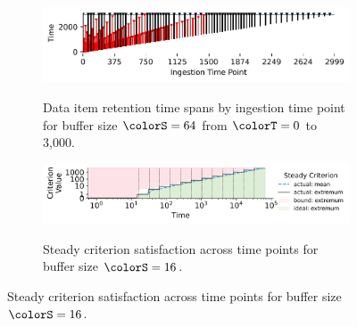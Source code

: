 \begin{figure}[htbp!]
  \vspace{-0.5ex}
   \begin{minipage}[]{\textwidth}
   \vspace{-2pt}
  \begin{subfigure}[t]{0.65\linewidth}
  \vspace{0pt}
    \centering
    \includegraphics[width=0.88\linewidth,clip]{binder/teeplots/11/num-generations=262144+surface-size=64+viz=stratum-persistence-dripplot+ext=}
  \end{subfigure}%
  \begin{subfigure}[t]{0.35\linewidth}
  \vspace{-2pt}
  \caption{%
    \footnotesize
    Data item retention time spans by ingestion time point for buffer size $\colorS=64$ from $\colorT=0$ to 3,000.
  }
  \label{fig:hsurf-steady-implementation-dripplot}
  \end{subfigure}
  \end{minipage}

  \vspace{-0.5ex}
 \begin{minipage}[]{\textwidth}
 \vspace{-2pt}
\begin{subfigure}[t]{0.65\linewidth}
\vspace{0pt}
  \centering
  \includegraphics[width=0.88\linewidth,clip]{binder/teeplots/11/hue=kind+surface-size=16+viz=criterion-satisfaction-lineplot+x=rank+y=steady-criterion+yscale=symlog+ext=}
\end{subfigure}%
\begin{subfigure}[t]{0.35\linewidth}
\vspace{-2pt}
\caption{%
  \footnotesize
  Steady criterion satisfaction across time points for buffer size $\colorS=16$.
}
\label{fig:hsurf-steady-implementation-satisfaction}
\end{subfigure}
\end{minipage}


\end{figure}
